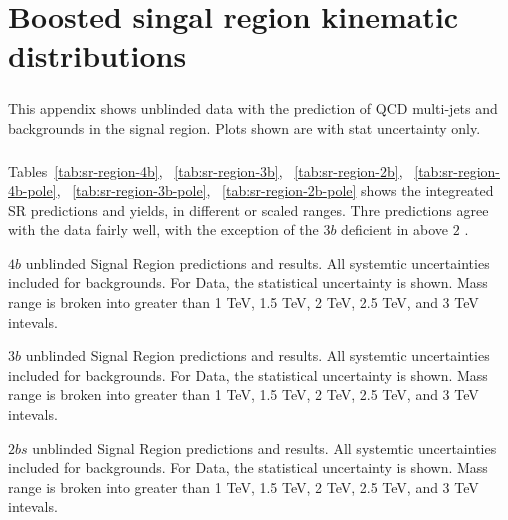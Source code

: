 \chapter{Boosted singal region kinematic distributions}
\label{AppendixSR}

\paragraph{}
This appendix shows unblinded data with the prediction of QCD multi-jets and \ttbar~ backgrounds in the signal region. Plots shown are with stat uncertainty only.

\paragraph{}
Tables~\ref{tab:sr-region-4b}, ~\ref{tab:sr-region-3b}, ~\ref{tab:sr-region-2b}, ~\ref{tab:sr-region-4b-pole}, ~\ref{tab:sr-region-3b-pole}, ~\ref{tab:sr-region-2b-pole} shows the integreated SR predictions and yields, in different \mtwoJ or scaled \mtwoJ ranges. Thre predictions agree with the data fairly well, with the exception of the $3b$ deficient in \mtwoJ above $2$ \TeV.

\begin{table}[htbp!]
\scriptsize
\begin{center}

\caption{$4b$ unblinded Signal Region predictions and results. All systemtic uncertainties included for backgrounds. For Data, the statistical uncertainty is shown. Mass range is broken into greater than 1 TeV, 1.5 TeV, 2 TeV, 2.5 TeV, and 3 TeV intevals.}
\label{tab:sr-region-4b}
\end{center}
\end{table}

\begin{table}[htbp!]
\scriptsize
\begin{center}

\caption{$3b$ unblinded Signal Region predictions and results. All systemtic uncertainties included for backgrounds. For Data, the statistical uncertainty is shown. Mass range is broken into greater than 1 TeV, 1.5 TeV, 2 TeV, 2.5 TeV, and 3 TeV intevals.}
\label{tab:sr-region-3b}
\end{center}
\end{table}

\begin{table}[htbp!]
\scriptsize
\begin{center}

\caption{$2bs$ unblinded Signal Region predictions and results. All systemtic uncertainties included for backgrounds. For Data, the statistical uncertainty is shown. Mass range is broken into greater than 1 TeV, 1.5 TeV, 2 TeV, 2.5 TeV, and 3 TeV intevals.}
\label{tab:sr-region-2b}
\end{center}
\end{table}



